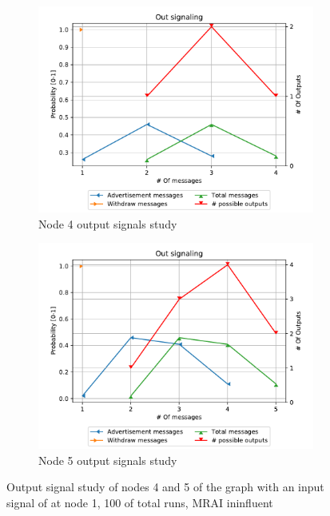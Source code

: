 \begin{figure}[h]
     \centering
     \begin{subfigure}[b]{0.49\textwidth}
         \centering
         \includegraphics[width=\textwidth]{images/signal_study/fig_4/fig_4_4_signaling_nmessage_prob.pdf}
		 \caption{Node \num{4} output signals study}
         \label{fig:signal_node4}
     \end{subfigure}
     \hfill
     \begin{subfigure}[b]{0.49\textwidth}
         \centering
         \includegraphics[width=\textwidth]{images/signal_study/fig_4/fig_4_5_signaling_nmessage_prob.pdf}
		 \caption{Node \num{5} output signals study}
         \label{fig:signal_node5}
     \end{subfigure}
		\caption{Output signal study of nodes \num{4} and \num{5} of the graph
			 with an input signal of  at node \num{1},
			\num{100} of total runs, \ac{MRAI} ininfluent}
        \label{fig:signal_griffin_fig4}
\end{figure}

